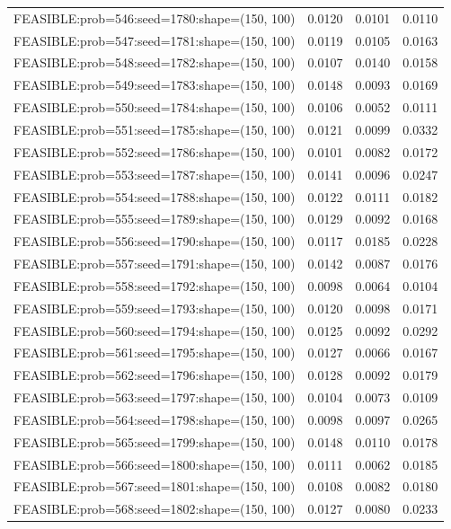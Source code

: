 \begin{longtable}{lccc}
FEASIBLE:prob=546:seed=1780:shape=(150, 100) &   0.0120 & 0.0101 & 0.0110 \\
FEASIBLE:prob=547:seed=1781:shape=(150, 100) &   0.0119 & 0.0105 & 0.0163 \\
FEASIBLE:prob=548:seed=1782:shape=(150, 100) &   0.0107 & 0.0140 & 0.0158 \\
FEASIBLE:prob=549:seed=1783:shape=(150, 100) &   0.0148 & 0.0093 & 0.0169 \\
FEASIBLE:prob=550:seed=1784:shape=(150, 100) &   0.0106 & 0.0052 & 0.0111 \\
FEASIBLE:prob=551:seed=1785:shape=(150, 100) &   0.0121 & 0.0099 & 0.0332 \\
FEASIBLE:prob=552:seed=1786:shape=(150, 100) &   0.0101 & 0.0082 & 0.0172 \\
FEASIBLE:prob=553:seed=1787:shape=(150, 100) &   0.0141 & 0.0096 & 0.0247 \\
FEASIBLE:prob=554:seed=1788:shape=(150, 100) &   0.0122 & 0.0111 & 0.0182 \\
FEASIBLE:prob=555:seed=1789:shape=(150, 100) &   0.0129 & 0.0092 & 0.0168 \\
FEASIBLE:prob=556:seed=1790:shape=(150, 100) &   0.0117 & 0.0185 & 0.0228 \\
FEASIBLE:prob=557:seed=1791:shape=(150, 100) &   0.0142 & 0.0087 & 0.0176 \\
FEASIBLE:prob=558:seed=1792:shape=(150, 100) &   0.0098 & 0.0064 & 0.0104 \\
FEASIBLE:prob=559:seed=1793:shape=(150, 100) &   0.0120 & 0.0098 & 0.0171 \\
FEASIBLE:prob=560:seed=1794:shape=(150, 100) &   0.0125 & 0.0092 & 0.0292 \\
FEASIBLE:prob=561:seed=1795:shape=(150, 100) &   0.0127 & 0.0066 & 0.0167 \\
FEASIBLE:prob=562:seed=1796:shape=(150, 100) &   0.0128 & 0.0092 & 0.0179 \\
FEASIBLE:prob=563:seed=1797:shape=(150, 100) &   0.0104 & 0.0073 & 0.0109 \\
FEASIBLE:prob=564:seed=1798:shape=(150, 100) &   0.0098 & 0.0097 & 0.0265 \\
FEASIBLE:prob=565:seed=1799:shape=(150, 100) &   0.0148 & 0.0110 & 0.0178 \\
FEASIBLE:prob=566:seed=1800:shape=(150, 100) &   0.0111 & 0.0062 & 0.0185 \\
FEASIBLE:prob=567:seed=1801:shape=(150, 100) &   0.0108 & 0.0082 & 0.0180 \\
FEASIBLE:prob=568:seed=1802:shape=(150, 100) &   0.0127 & 0.0080 & 0.0233 \\

\end{longtable}
